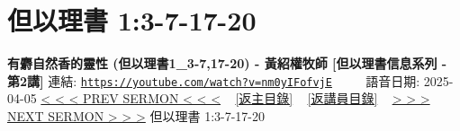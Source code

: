 \documentclass{book}
\begin{document}
\section{但以理書 1:3-7-17-20}
\label{sec:nm0yIFofvjE}
\textbf{有麝自然香的靈性 (但以理書1\_3-7,17-20) - 黃紹權牧師  [但以理書信息系列 - 第2講]}
\newline
\newline
連結: \href{https://youtube.com/watch?v=nm0yIFofvjE}{\texttt{https://youtube.com/watch?v=nm0yIFofvjE}} ~~~~ 語音日期: 2025-04-05
\newline
\newline
\hyperref[sec:g49XieTOO9Y]{< < < PREV SERMON < < <}
~
\hyperlink{toc}{[返主目錄]}
~
\hyperref[ch:preacher18]{[返講員目錄]}
~
\hyperref[sec:9Y2Bozsh9Bw]{> > > NEXT SERMON > > >}
\newline
\newline
但以理書 1:3-7-17-20
\newline
\end{document}
